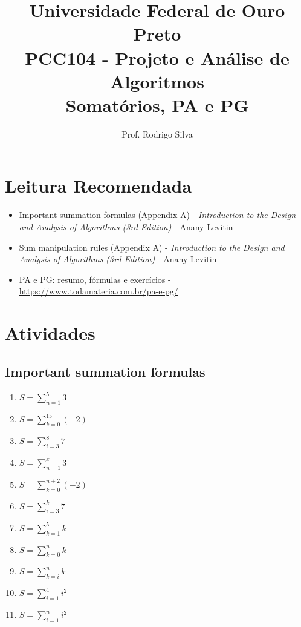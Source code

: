 \documentclass{article}
\title{\vspace{-2 cm}Universidade Federal de Ouro Preto \\ PCC104 - Projeto e Análise de Algoritmos \\ Somatórios, PA e PG}
\author{Prof. Rodrigo Silva}
\begin{document}
\maketitle

\section*{Leitura Recomendada}

\begin{itemize}
    \item Important summation formulas (Appendix A) - \textit{Introduction to the Design and Analysis of Algorithms (3rd Edition)} - Anany Levitin 
    \item Sum manipulation rules (Appendix A) - \textit{Introduction to the Design and Analysis of Algorithms (3rd Edition)} - Anany Levitin 
    \item PA e PG: resumo, fórmulas e exercícios - \url{https://www.todamateria.com.br/pa-e-pg/}
\end{itemize}


\section{Atividades}

\subsection{Important summation formulas}

\begin{enumerate}

    \item $ S = \sum_{n=1}^{5} 3 $
    \item $ S = \sum_{k=0}^{15} (-2) $
    \item $ S = \sum_{i=3}^{8} 7 $
    \item $ S = \sum_{n=1}^{x} 3 $
    \item $ S = \sum_{k=0}^{n+2} (-2) $
    \item $ S = \sum_{i=3}^{k} 7 $
    \item $ S = \sum_{k=1}^{5} k$ 
    \item $ S = \sum_{k=0}^{n} k$
    \item $ S = \sum_{k=i}^{n} k$
    \item $ S = \sum_{i=1}^{4} i^2$
    \item $ S = \sum_{i=1}^{n} i^2 $
    
\end{enumerate}
\end{document}

